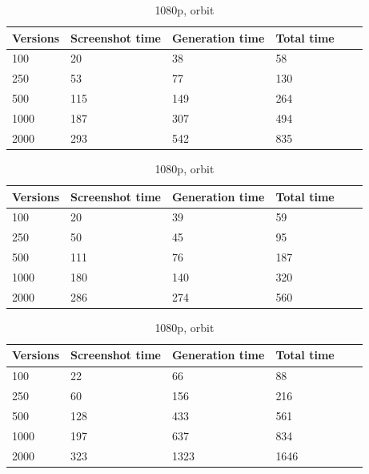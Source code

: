 \documentclass[]{usiinfbachelorproject}
\begin{document}
\begin{table}[H]
    \begin{center}
        \begin{tabular}{ | l | l | l | l | l | l |}
        \hline
        Versions & Screenshot time & Generation time & Total time \\ \hline
        100 & 20 & 38 & 58 \\ \hline
        250 & 53 & 77 & 130\\ \hline
        500 & 115 & 149 & 264\\ \hline
        1000 & 187 & 307 & 494 \\ \hline
        2000 & 293 & 542 & 835 \\ \hline
        \end{tabular}
    \end{center}
    \caption{720p, orbit}
    \label{tab:performance}

    \begin{center}
        \begin{tabular}{ | l | l | l | l | l | l |}
        \hline
        Versions & Screenshot time & Generation time & Total time \\ \hline
        100 & 20 & 39 & 59 \\ \hline
        250 & 50 & 45 & 95\\ \hline
        500 & 111 & 76 & 187\\ \hline
        1000 & 180 & 140 & 320 \\ \hline
        2000 & 286 & 274 & 560 \\ \hline
        \end{tabular}
    \end{center}
    \caption{720p, no orbit}
    \label{tab:performance}

    \begin{center}
        \begin{tabular}{ | l | l | l | l | l | l |}
        \hline
        Versions & Screenshot time & Generation time & Total time \\ \hline
        100 & 22 & 66 & 88 \\ \hline
        250 & 60 & 156 & 216\\ \hline
        500 & 128 & 433 & 561\\ \hline
        1000 & 197 & 637 & 834\\ \hline
        2000 & 323 & 1323 & 1646\\ \hline
        \end{tabular}
    \end{center}
    \caption{1080p, orbit}
    \label{tab:performance}


\end{table}
\end{document}
